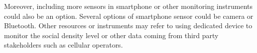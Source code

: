 Moreover, including more sensors in smartphone or other monitoring instruments could also be an option. Several options of smartphone sensor could be camera or Bluetooth. Other resources or instruments may refer to using dedicated device to monitor the social density level or other data coming from third party stakeholders such as cellular operators.


